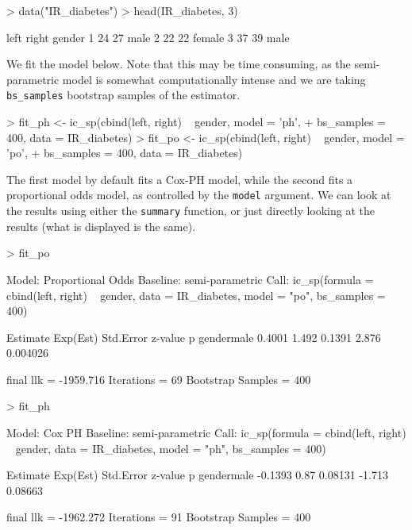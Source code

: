 \documentclass[a4paper]{article}
\begin{document}
\begin{Schunk}
\begin{Sinput}
> data("IR_diabetes")
> head(IR_diabetes, 3)
\end{Sinput}
\begin{Soutput}
  left right gender
1   24    27   male
2   22    22 female
3   37    39   male
\end{Soutput}
\end{Schunk}
  
We fit the model below. Note that this may be time consuming, as the semi-parametric model is somewhat computationally intense and we are taking \texttt{bs\_samples} bootstrap samples of the estimator. 
  
\begin{Schunk}
\begin{Sinput}
>   fit_ph <- ic_sp(cbind(left, right) ~ gender, model = 'ph', 
+                   bs_samples = 400, data = IR_diabetes)
>   fit_po <- ic_sp(cbind(left, right) ~ gender, model = 'po',
+                   bs_samples = 400, data = IR_diabetes)
\end{Sinput}
\end{Schunk}

The first model by default fits a Cox-PH model, while the second fits a proportional odds model, as controlled by the \texttt{model} argument. We can look at the results using either the \texttt{summary} function, or just directly looking at the results (what is displayed is the same). 
  
\begin{Schunk}
\begin{Sinput}
>   fit_po
\end{Sinput}
\begin{Soutput}
Model:  Proportional Odds
Baseline:  semi-parametric 
Call: ic_sp(formula = cbind(left, right) ~ gender, data = IR_diabetes, 
    model = "po", bs_samples = 400)

           Estimate Exp(Est) Std.Error z-value        p
gendermale   0.4001    1.492    0.1391   2.876 0.004026

final llk =  -1959.716 
Iterations =  69 
Bootstrap Samples =  400 
\end{Soutput}
\begin{Sinput}
>   fit_ph
\end{Sinput}
\begin{Soutput}
Model:  Cox PH
Baseline:  semi-parametric 
Call: ic_sp(formula = cbind(left, right) ~ gender, data = IR_diabetes, 
    model = "ph", bs_samples = 400)

           Estimate Exp(Est) Std.Error z-value       p
gendermale  -0.1393     0.87   0.08131  -1.713 0.08663

final llk =  -1962.272 
Iterations =  91 
Bootstrap Samples =  400 
\end{Soutput}
\end{Schunk}
\end{document}
